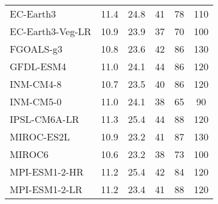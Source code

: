 \begin{table}
\begin{tabular}{lccccc}
  EC-Earth3          & 11.4                               & 24.8                               & 41                                 & 78                                 & 110                                \\
  EC-Earth3-Veg-LR   & 10.9                               & 23.9                               & 37                                 & 70                                 & 100                                \\
  FGOALS-g3          & 10.8                               & 23.6                               & 42                                 & 86                                 & 130                                \\
  GFDL-ESM4          & 11.0                               & 24.1                               & 44                                 & 86                                 & 120                                \\
  INM-CM4-8          & 10.7                               & 23.5                               & 40                                 & 86                                 & 120                                \\
  INM-CM5-0          & 11.0                               & 24.1                               & 38                                 & 65                                 & 90                                 \\
  IPSL-CM6A-LR       & 11.3                               & 25.4                               & 44                                 & 88                                 & 120                                \\
  MIROC-ES2L         & 10.9                               & 23.2                               & 41                                 & 87                                 & 130                                \\
  MIROC6             & 10.6                               & 23.2                               & 38                                 & 73                                 & 100                                \\
  MPI-ESM1-2-HR      & 11.2                               & 25.4                               & 42                                 & 84                                 & 120                                \\
  MPI-ESM1-2-LR      & 11.2                               & 23.4                               & 41                                 & 88                                 & 120                                \\

\end{tabular}
\end{table}
